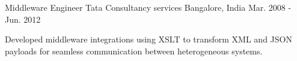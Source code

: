 \begin{cventries}
  \cventry
    {Middleware Engineer} %
    {Tata Consultancy services} %
    {Bangalore, India} %
    {Mar. 2008 - Jun. 2012} %
    {
      \begin{cvitems} %
        \item {Developed middleware integrations using XSLT to transform XML and JSON payloads for seamless communication between heterogeneous systems.}
      \end{cvitems}
    }


\end{cventries}
